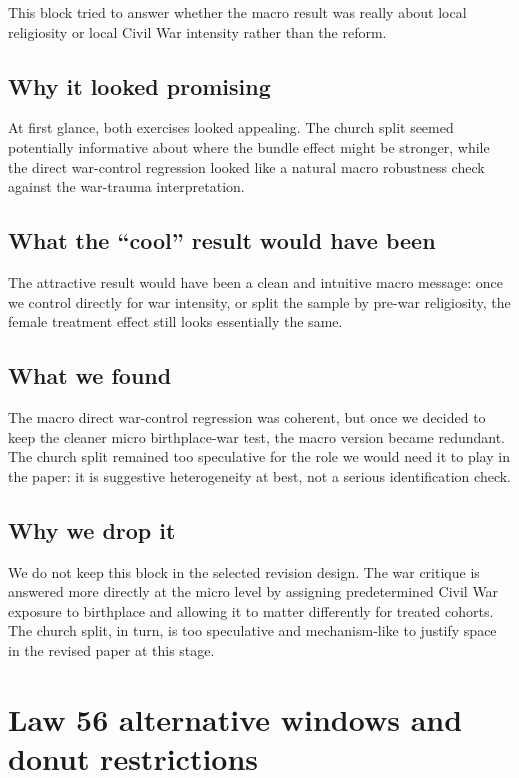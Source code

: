 \documentclass[11pt]{article}
\begin{document}
This block tried to answer whether the macro result was really about local religiosity or local Civil War intensity rather than the reform.

\subsection*{Why it looked promising}

At first glance, both exercises looked appealing. The church split seemed potentially informative about where the bundle effect might be stronger, while the direct war-control regression looked like a natural macro robustness check against the war-trauma interpretation.

\subsection*{What the ``cool'' result would have been}

The attractive result would have been a clean and intuitive macro message: once we control directly for war intensity, or split the sample by pre-war religiosity, the female treatment effect still looks essentially the same.

\subsection*{What we found}

The macro direct war-control regression was coherent, but once we decided to keep the cleaner micro birthplace-war test, the macro version became redundant. The church split remained too speculative for the role we would need it to play in the paper: it is suggestive heterogeneity at best, not a serious identification check.

\subsection*{Why we drop it}

We do not keep this block in the selected revision design. The war critique is answered more directly at the micro level by assigning predetermined Civil War exposure to birthplace and allowing it to matter differently for treated cohorts. The church split, in turn, is too speculative and mechanism-like to justify space in the revised paper at this stage.

\section{Law 56 alternative windows and donut restrictions}
\end{document}
